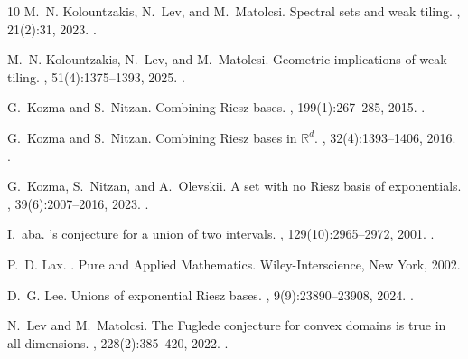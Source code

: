 \documentclass[12pt,reqno,tbtags]{amsart}
\def\L{\mathcal{L}}
\newcommand\1{\mathbbm{1}}
\begin{document}
\begin{thebibliography}{10}
M.~N. Kolountzakis, N.~Lev, and M.~Matolcsi.
\newblock Spectral sets and weak tiling.
,
  21(2):31, 2023.
\newblock \href {https://doi.org/10.1007/s43670-023-00070-w}
  {}.

M.~N. Kolountzakis, N.~Lev, and M.~Matolcsi.
\newblock Geometric implications of weak tiling.
, 51(4):1375--1393, 2025.
\newblock \href {https://doi.org/10.1007/s10476-025-00121-5}
  {}.

G.~Kozma and S.~Nitzan.
\newblock Combining {Riesz} bases.
, 199(1):267--285, 2015.
\newblock \href {https://doi.org/10.1007/s00222-014-0522-3}
  {}.

G.~Kozma and S.~Nitzan.
\newblock Combining {Riesz} bases in {$\mathbb{R}^d$}.
, 32(4):1393--1406, 2016.
\newblock \href {https://doi.org/10.4171/RMI/922} {}.

G.~Kozma, S.~Nitzan, and A.~Olevskii.
\newblock A set with no {Riesz} basis of exponentials.
, 39(6):2007--2016, 2023.
\newblock \href {https://doi.org/10.4171/RMI/1411}
  {}.

I.~{\L}aba.
's conjecture for a union of two intervals.
,
  129(10):2965--2972, 2001.
\newblock \href {https://doi.org/10.1090/S0002-9939-01-06035-X}
  {}.

P.~D. Lax.
.
\newblock Pure and Applied Mathematics. Wiley-Interscience, New York, 2002.

D.~G. Lee.
\newblock Unions of exponential {Riesz} bases.
, 9(9):23890--23908, 2024.
\newblock \href {https://doi.org/10.3934/math.20241161}
  {}.

N.~Lev and M.~Matolcsi.
\newblock The {Fuglede} conjecture for convex domains is true in all
  dimensions.
, 228(2):385--420, 2022.
\newblock \href {https://doi.org/10.4310/ACTA.2022.v228.n2.a3}
  {}.


\end{thebibliography}
\end{document}
